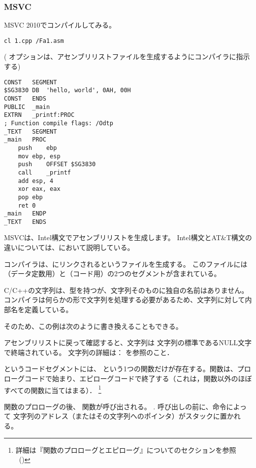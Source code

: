 \subsubsection{MSVC}

MSVC 2010でコンパイルしてみる。

\begin{lstlisting}
cl 1.cpp /Fa1.asm
\end{lstlisting}

( オプションは、アセンブリリストファイルを生成するようにコンパイラに指示する)

\begin{lstlisting}[caption=MSVC 2010,style=customasmx86]
CONST	SEGMENT
$SG3830	DB	'hello, world', 0AH, 00H
CONST	ENDS
PUBLIC	_main
EXTRN	_printf:PROC
; Function compile flags: /Odtp
_TEXT	SEGMENT
_main	PROC
	push	ebp
	mov	ebp, esp
	push	OFFSET $SG3830
	call	_printf
	add	esp, 4
	xor	eax, eax
	pop	ebp
	ret	0
_main	ENDP
_TEXT	ENDS
\end{lstlisting}

MSVCは、Intel構文でアセンブリリストを生成します。 Intel構文とAT\&T構文の違いについては、において説明している。

コンパイラは、にリンクされるというファイルを生成する。
このファイルには（データ定数用）と（コード用）の2つのセグメントが含まれている。

\label{string_is_const_char}
C/C++の文字列は、型を持つが、文字列そのものに独自の名前はありません。
コンパイラは何らかの形で文字列を処理する必要があるため、文字列に対して内部名を定義している。

そのため、この例は次のように書き換えることもできる。



アセンブリリストに戻って確認すると、文字列は \CCpp 文字列の標準であるNULL文字で終端されている。 \CCpp 文字列の詳細は：  を参照のこと．

というコードセグメントには、 \main{} という1つの関数だけが存在する。\main 関数は、プロローグコードで始まり、エピローグコードで終了する（これは，\main 関数以外のほぼすべての関数に当てはまる）．
\footnote{詳細は『関数のプロローグとエピローグ』についてのセクションを参照 ~()}

関数のプロローグの後、\printf{} 関数が呼び出される。
.
呼び出しの前に、\PUSH 命令によって  文字列のアドレス（またはその文字列へのポインタ）がスタックに置かれる。

